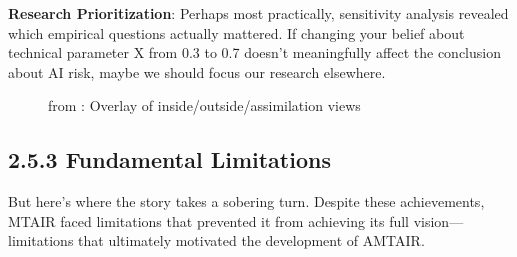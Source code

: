 \documentclass[
  11pt,
  letterpaper,
  openany]{book}
\begin{document}
\textbf{Research Prioritization}: Perhaps most practically, sensitivity
analysis revealed which empirical questions actually mattered. If
changing your belief about technical parameter X from 0.3 to 0.7 doesn't
meaningfully affect the conclusion about AI risk, maybe we should focus
our research elsewhere.

\begin{figure}


\caption[Overlay of inside/outside/assimilation
views]{\label{fig-mtair-insideoutside-overlay}from
\textcite{manheim2021}: Overlay of inside/outside/assimilation views}

\end{figure}%

\subsection{2.5.3 Fundamental Limitations}\label{sec-mtair-limitations}

But here's where the story takes a sobering turn. Despite these
achievements, MTAIR faced limitations that prevented it from achieving
its full vision---limitations that ultimately motivated the development
of AMTAIR.
\end{document}
